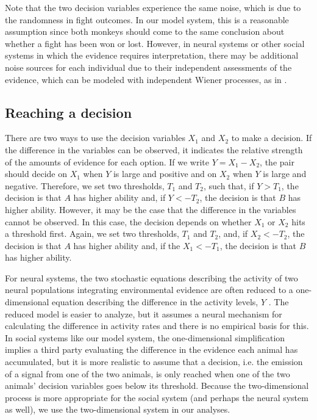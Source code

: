 \documentclass{pnastwo}
\begin{document}
\begin{article}
Note that the two decision variables experience the same noise, which is due to the randomness in fight outcomes. In our model system, this is a reasonable assumption since both monkeys should come to the same conclusion about whether a fight has been won or lost. However, in neural systems or other social systems in which the evidence requires interpretation, there may be additional noise sources for each individual due to their independent assessments of the evidence, which can be modeled with independent Wiener processes, as in \cite{Feng:2009kl,Brown:2005fk,Bogacz:2006uq,Froment:2010fk}. 


\subsection{Reaching a decision}
There are two ways to use the decision variables $X_1$ and $X_2$ to make a decision.  If the difference in the variables can be observed, it indicates the relative strength of the amounts of evidence for each option. If we write $Y=X_1-X_2$, the pair should decide on $X_1$ when $Y$ is large and positive and on $X_2$ when $Y$ is large and negative.  
Therefore, we set two thresholds, $T_1$ and $T_2$, such that, if $Y>T_1$, the decision is that $A$ has higher ability and, if $Y<-T_2$, the decision is that $B$ has higher ability.  However, it may be the case that the difference in the variables cannot be observed.  In this case, the decision depends on whether $X_1$ or $X_2$ hits a threshold first.  Again, we set two thresholds, $T_1$ and $T_2$, and, if $X_2<-T_2$, the decision is that $A$ has higher ability and, if the $X_1<-T_1$, the decision is that $B$ has higher ability.   

For neural systems, the two stochastic equations describing the activity of two neural populations integrating environmental evidence are often reduced to a one-dimensional equation describing the difference in the activity levels, $Y$ \cite{Brown:2005fk,Bogacz:2006uq,Feng:2009kl}. The reduced model is easier to analyze, but it assumes a neural mechanism for calculating the difference in activity rates and there is no empirical basis for this. In social systems like our model system, the one-dimensional simplification implies a third party evaluating the difference in the evidence each animal has accumulated, but it is more realistic to assume that a decision, i.e. the emission of a signal from one of the two animals, is only reached when one of the two animals' decision variables goes below its threshold. Because the two-dimensional process is more appropriate for the social system (and perhaps the neural system as well), we use the two-dimensional system in our analyses.


\end{article}
\end{document}
